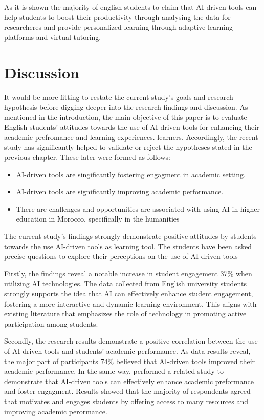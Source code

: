 As it is shown the majority of english students to claim that AI-driven tools can
help students to boost their productivity through analysing the data for researcheres
and provide personalized learning through adaptive learning platforms and virtual tutoring.

\section{Discussion}
It would be more fitting to restate the current study’s goals and research hypothesis
before digging deeper into the research findings and discussion. As mentioned in the
introduction, the main objective of this paper is to evaluate English students’ attitudes towards the
use of AI-driven tools for enhancing their academic prefromance and learning experiences.
learners. Accordingly, the recent study has significantly helped
to validate or reject the hypotheses stated in the previous chapter.
These later were formed as follows:
\begin{itemize}
	\item AI-driven tools are singificantly fostering engagment in academic setting.
	\item AI-driven tools are significantly improving academic performance.
	\item There are challenges and opportunities are associated with using AI in higher education
	      in Morocco, specifically in the humanities
\end{itemize}
The current study’s findings strongly demonstrate positive attitudes by students towards
the use AI-driven tools as learning tool. The students have been asked precise questions
to explore their perceptions on the use of AI-driven tools

Firstly, the findings reveal a notable increase in student engagement 37\% when 
utilizing AI technologies. The data collected from English university students
strongly supports the idea that AI can effectively enhance student engagement,
fostering a more interactive and dynamic learning environment. This aligns with
existing literature that emphasizes the role of technology in promoting active
participation among students.

Secondly, the research results demonstrate a positive correlation between the use of AI-driven tools and students' academic performance. 
As data results reveal, the major part of participants 74\% believed that AI-driven tools
improved their academic performance. In the same way, 
\citep{mohammed_exploring_2023} performed a related study
to demonstrate that AI-driven tools can effectively enhance 
academic preformance and foster engagment. Results showed
that the majority of respondents agreed that  
motivates and engages students by offering access to 
many resources and improving academic perormance. 

